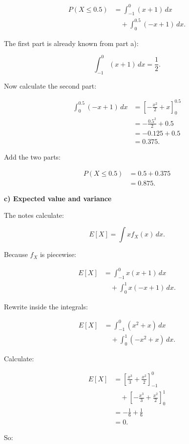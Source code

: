 \documentclass[10pt]{article}
\begin{document}
\begin{align*}
P(X\le 0.5)
&=
\int_{-1}^{0}(x+1)\,dx \\
&\quad+
\int_{0}^{0.5}(-x+1)\,dx.
\end{align*}

The first part is already known from part a):

\[
\int_{-1}^{0}(x+1)\,dx=\frac{1}{2}.
\]

Now calculate the second part:

\begin{align*}
\int_{0}^{0.5}(-x+1)\,dx
&=
\left[
-\frac{x^2}{2}+x
\right]_{0}^{0.5} \\[2mm]
&=
-\frac{0.5^2}{2}+0.5 \\[2mm]
&=
-0.125+0.5 \\[2mm]
&=0.375.
\end{align*}

Add the two parts:

\begin{align*}
P(X\le 0.5)
&=0.5+0.375 \\[2mm]
&=0.875.
\end{align*}

\textbf{c) Expected value and variance}

The notes calculate:

\[
E[X]
=
\int x f_X(x)\,dx.
\]

Because \(f_X\) is piecewise:

\begin{align*}
E[X]
&=
\int_{-1}^{0}x(x+1)\,dx \\
&\quad+
\int_{0}^{1}x(-x+1)\,dx.
\end{align*}

Rewrite inside the integrals:

\begin{align*}
E[X]
&=
\int_{-1}^{0}(x^2+x)\,dx \\
&\quad+
\int_{0}^{1}(-x^2+x)\,dx.
\end{align*}

Calculate:

\begin{align*}
E[X]
&=
\left[
\frac{x^3}{3}
+\frac{x^2}{2}
\right]_{-1}^{0} \\
&\quad+
\left[
-\frac{x^3}{3}
+\frac{x^2}{2}
\right]_{0}^{1} \\[2mm]
&=
-\frac{1}{6}
+\frac{1}{6} \\[2mm]
&=0.
\end{align*}

So:
\end{document}
